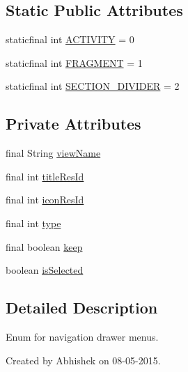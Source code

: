 \subsection*{Static Public Attributes}
\begin{DoxyCompactItemize}
\item 
staticfinal int \hyperlink{enumorg_1_1buildmlearn_1_1toolkit_1_1model_1_1Section_a9afae152c2f7c91883417b9de909da27}{A\+C\+T\+I\+V\+I\+TY} = 0
\item 
staticfinal int \hyperlink{enumorg_1_1buildmlearn_1_1toolkit_1_1model_1_1Section_a536f7f08eb441bb4af16270238999cc4}{F\+R\+A\+G\+M\+E\+NT} = 1
\item 
staticfinal int \hyperlink{enumorg_1_1buildmlearn_1_1toolkit_1_1model_1_1Section_acc0a57a45c96711214e40f17b5b3cfe0}{S\+E\+C\+T\+I\+O\+N\+\_\+\+D\+I\+V\+I\+D\+ER} = 2
\end{DoxyCompactItemize}
\subsection*{Private Attributes}
\begin{DoxyCompactItemize}
\item 
final String \hyperlink{enumorg_1_1buildmlearn_1_1toolkit_1_1model_1_1Section_af21ab2867b4154f9869eab7856f3a658}{view\+Name}
\item 
final int \hyperlink{enumorg_1_1buildmlearn_1_1toolkit_1_1model_1_1Section_accd3e04504db3b956fb5d123ecdeca8a}{title\+Res\+Id}
\item 
final int \hyperlink{enumorg_1_1buildmlearn_1_1toolkit_1_1model_1_1Section_ae100070151f5fec230914d56d01ac763}{icon\+Res\+Id}
\item 
final int \hyperlink{enumorg_1_1buildmlearn_1_1toolkit_1_1model_1_1Section_a51c49be1e1c109404b43c45c9b9c0df4}{type}
\item 
final boolean \hyperlink{enumorg_1_1buildmlearn_1_1toolkit_1_1model_1_1Section_a87db2a68da123249ea5d0dec338a2416}{keep}
\item 
boolean \hyperlink{enumorg_1_1buildmlearn_1_1toolkit_1_1model_1_1Section_a7b69e14d7f9a41cf17e54d3fe0703c28}{is\+Selected}
\end{DoxyCompactItemize}


\subsection{Detailed Description}
Enum for navigation drawer menus. 

Created by Abhishek on 08-\/05-\/2015. 

